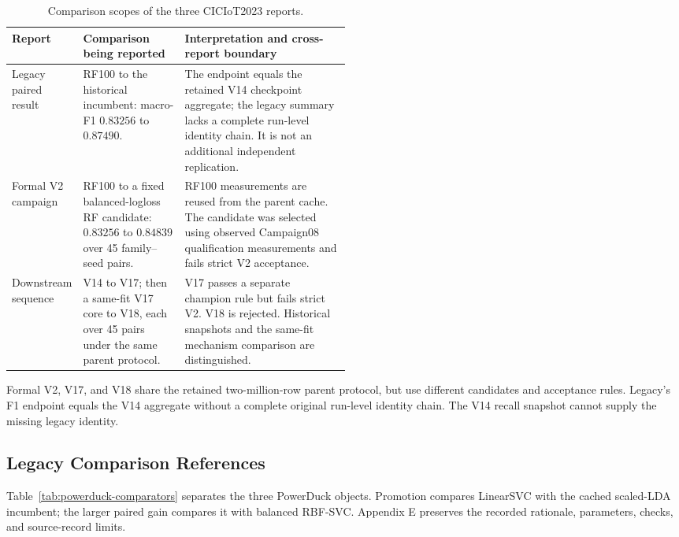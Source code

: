 \documentclass[manuscript,screen,nonacm]{acmart}
\begin{document}
\begin{table}[htbp]
\caption{Comparison scopes of the three CICIoT2023 reports.}
\label{tab:ciciot-scopes}
\centering
\begin{tabularx}{\linewidth}{>{\raggedright\arraybackslash}p{0.20\linewidth}>{\raggedright\arraybackslash}p{0.30\linewidth}>{\raggedright\arraybackslash}X}
\toprule
\textbf{Report} & \textbf{Comparison being reported} & \textbf{Interpretation and cross-report boundary} \\
\midrule
Legacy paired result & RF100 to the historical incumbent: macro-F1 $0.83256$ to $0.87490$. & The endpoint equals the retained V14 checkpoint aggregate; the legacy summary lacks a complete run-level identity chain. It is not an additional independent replication. \\
Formal V2 campaign & RF100 to a fixed balanced-logloss RF candidate: $0.83256$ to $0.84839$ over 45 family--seed pairs. & RF100 measurements are reused from the parent cache. The candidate was selected using observed Campaign08 qualification measurements and fails strict V2 acceptance. \\
Downstream sequence & V14 to V17; then a same-fit V17 core to V18, each over 45 pairs under the same parent protocol. & V17 passes a separate champion rule but fails strict V2. V18 is rejected. Historical snapshots and the same-fit mechanism comparison are distinguished. \\
\bottomrule
\end{tabularx}
\end{table}

Formal V2, V17, and V18 share the retained two-million-row parent protocol,
but use different candidates and acceptance rules. Legacy's F1 endpoint
equals the V14 aggregate without a complete original run-level identity
chain. The V14 recall snapshot cannot supply the missing legacy identity.

\subsection{Legacy Comparison References}
\label{sec:legacy}

Table~\ref{tab:powerduck-comparators} separates the three PowerDuck objects.
Promotion compares LinearSVC with the cached scaled-LDA incumbent; the
larger paired gain compares it with balanced RBF-SVC. Appendix E preserves
the recorded rationale, parameters, checks, and source-record limits.
\end{document}
